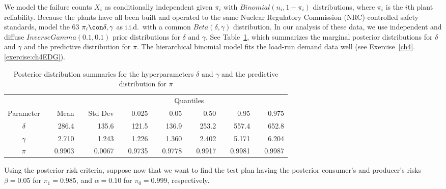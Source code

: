 \documentclass {book}
\begin{document}
\begin{sidebar}
We model the failure counts $X_i$ as conditionally independent given
$\pi_i$ with $Binomial(n_i,1 - \pi_i)$ distributions, where
$\pi_i$ is the $i$th plant reliability. Because the plants have
all been built and operated to the same Nuclear Regulatory
Commission (NRC)-controlled safety standards, model the 63
$\pi_i \con \delta, \gamma$ as i.i.d.\ with a common
$Beta(\delta,\gamma)$ distribution. In our analysis of these data,
we use independent and diffuse $InverseGamma(0.1,0.1)$ prior
distributions for $\delta$ and $\gamma$. See
Table~\ref{ch10:tab2}, which summarizes the marginal posterior
distributions for $\delta$ and $\gamma$ and the predictive
distribution for $\pi$. The hierarchical binomial model fits the
load-run demand data well (see
Exercise~\ref{ch4}.\ref{exercise:ch4EDG}).

\begin{table}
\caption{Posterior distribution summaries for the hyperparameters
$\delta$ and $\gamma$ and the predictive distribution for
$\pi$}\label{ch10:tab2}
 \centering
\begin{tabular}{crrrrrrrrrrrrrr}
\hline                              &       &    &       &       &
 &                                & & \multicolumn{3}{c}{Quantiles}  & &
 \\ \cline{7-15}
 Parameter&\mbox{}&Mean&\mbox{}&Std
 Dev&\mbox{}\mbox{}\mbox{}
 &\multicolumn{1}{r}{0.025}&\mbox{}&\multicolumn{1}{r}{0.05}&\mbox{}&0.50 & \mbox{} & \multicolumn{1}{r}{0.95}& \mbox{} & \multicolumn{1}{r}{0.975}\\
\hline%
$\delta$ &\mbox{}   &286.4&\mbox{}  &135.6&\mbox{}  &121.5&\mbox{}  &136.9&\mbox{}  &253.2&\mbox{}  &557.4&\mbox{}   &652.8\\
$\gamma$&\mbox{}    &2.710&\mbox{}  &1.243&\mbox{}  &1.226&\mbox{}  &1.360&\mbox{}  &2.402&\mbox{}  &5.171&\mbox{}   &6.204\\
$\pi$&\mbox{}& 0.9903 &\mbox{}& 0.0067 &\mbox{}& 0.9735 &\mbox{}& 0.9778 &\mbox{}& 0.9917 &\mbox{}& 0.9981 &\mbox{}& 0.9987 \\
\hline
\end{tabular}
\end{table}

Using the posterior risk criteria, suppose now that we want to
find the test plan having the posterior consumer's and producer's
risks $\beta = 0.05$ for $\pi_{1} = 0.985$, and $\alpha = 0.10$
for $\pi_{0} = 0.999$, respectively.


\end{sidebar}
\end{document}
